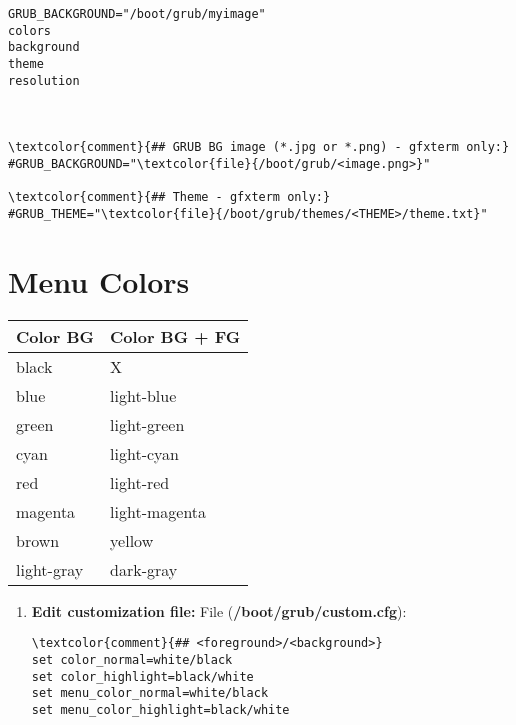 \documentclass[10pt, a4paper, onecolumn, openany]{book} %
\begin{document}
\begin{enumerate}
\begin{Verbatim}[commandchars=\\\{\}]
GRUB_BACKGROUND="/boot/grub/myimage"
colors
background
theme
resolution



\textcolor{comment}{## GRUB BG image (*.jpg or *.png) - gfxterm only:}
#GRUB_BACKGROUND="\textcolor{file}{/boot/grub/<image.png>}"

\textcolor{comment}{## Theme - gfxterm only:}
#GRUB_THEME="\textcolor{file}{/boot/grub/themes/<THEME>/theme.txt}"
\end{Verbatim}
\end{enumerate}
\section{Menu Colors}
\begin{center}
    \begin{small}
    \begin{tabular}{|p{4cm}|p{4cm}|}
    \hline
    \textbf{Color BG} & \textbf{Color BG + FG} \\
    \hline
    black & X \\
    \hline
    blue & light-blue \\
    \hline
    green & light-green \\
    \hline
    cyan & light-cyan \\
    \hline
    red & light-red \\
    \hline
    magenta & light-magenta \\
    \hline
    brown & yellow \\
    \hline
    light-gray & dark-gray  \\
    \hline
    \end{tabular}
    \end{small}
\end{center}
\begin{enumerate}
    \item \textbf{Edit customization file:}
\newline File (\textbf{\textcolor{file}{/boot/grub/custom.cfg}}):
\begin{Verbatim}[commandchars=\\\{\}]
\textcolor{comment}{## <foreground>/<background>}
set color_normal=white/black
set color_highlight=black/white
set menu_color_normal=white/black
set menu_color_highlight=black/white
\end{Verbatim}
\end{enumerate}
\end{document}
